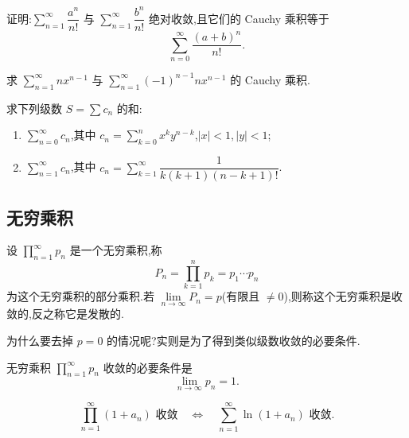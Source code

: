 \documentclass[../../数学分析培优讲义.tex]{subfiles}
\begin{document}
\begin{example}
证明:$\displaystyle\sum\limits_{n=1}^{\infty}\dfrac{a^n}{n!}$ 与 $\displaystyle\sum\limits_{n=1}^{\infty}\dfrac{b^n}{n!}$ 绝对收敛,且它们的 Cauchy 乘积等于
\[
    \sum\limits_{n=0}^{\infty}\dfrac{(a+b)^n}{n!}.
\]
\end{example}
\exampleblank

\begin{example}
求 $\displaystyle\sum\limits_{n=1}^{\infty}nx^{n-1}$ 与 $\displaystyle\sum\limits_{n=1}^{\infty}(-1)^{n-1}nx^{n-1}$ 的 Cauchy 乘积.
\end{example}
\exampleblank

\begin{example}
求下列级数 $S=\sum c_n$ 的和:
\begin{enumerate}[label=(\arabic*)]
    \item $\displaystyle\sum\limits_{n=0}^{\infty}c_n$,其中 $\displaystyle c_n=\sum\limits_{k=0}^nx^ky^{n-k}$,$|x|<1,|y|<1$;
    \item $\displaystyle\sum\limits_{n=1}^{\infty}c_n$,其中 $\displaystyle c_n=\sum\limits_{k=1}^{\infty}\dfrac{1}{k(k+1)(n-k+1)!}$.
\end{enumerate}
\end{example}
\exampleblank



\subsection{无穷乘积}

\begin{definition}
设 $\displaystyle\prod\limits_{n=1}^{\infty}p_n$ 是一个无穷乘积,称
\[
    P_n=\prod\limits_{k=1}^np_k=p_1\cdots p_n
\]
为这个无穷乘积的部分乘积.若 $\displaystyle\lim\limits_{n\to\infty}P_n=p$(有限且 $\neq0$),则称这个无穷乘积是收敛的,反之称它是发散的.
\end{definition}

为什么要去掉 $p=0$ 的情况呢?实则是为了得到类似级数收敛的必要条件.

\begin{theorem}[\markstar]
无穷乘积 $\displaystyle\prod\limits_{n=1}^{\infty}p_n$ 收敛的必要条件是
\[
    \lim\limits_{n\to\infty}p_n=1.
\]
\end{theorem}

\begin{theorem}[\markstar]
\[
    \prod\limits_{n=1}^{\infty}(1+a_n)\text{ 收敛}
    \quad\Longleftrightarrow\quad
    \sum\limits_{n=1}^{\infty}\ln(1+a_n)\text{ 收敛}.
\]
\end{theorem}
\end{document}
